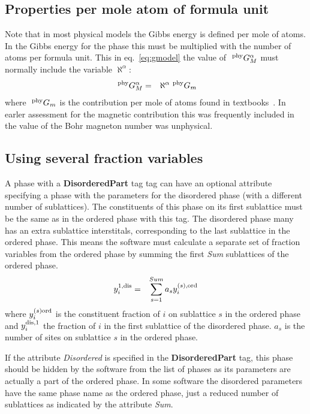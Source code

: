 \documentclass{article}
\begin{document}
\subsection{Properties per mole atom of formula unit}\label{sec:physmod}

Note that in most physical models the Gibbs energy is defined per mole
of atoms.  In the Gibbs energy for the phase this must be multiplied
with the number of atoms per formula unit.  This in
eq.~\ref{eq:gmodel} the value of $~^{\rm phy}G^{\alpha}_M$ must
normally include the variable $\aleph^{\alpha}$:
\begin{eqnarray}
~^{\rm phy}G^{\alpha}_M &=& \aleph^{\alpha} ~^{\rm phy}G_m \label{eq:perfm}
\end{eqnarray}
where $~^{\rm phy}G_m$ is the contribution per mole of atoms found in
textbooks~\cite{00Ans}.  In earler assessment for the magnetic
contribution this was frequently included in the value of the Bohr
magneton number was unphysical.



\subsection{Using several fraction variables}\label{sec:nodis}

A phase with a {\bf DisorderedPart} tag tag can have an optional
attribute specifying a phase with the parameters for the disordered
phase (with a different number of sublattices). The constituents of
this phase on its first sublattice must be the same as in the ordered
phase with this tag.  The disordered phase many has an extra
sublattice interstitals, corresponding to the last sublattice in the
ordered phase.  This means the software must calculate a separate set
of fraction variables from the ordered phase by summing the first {\em
  Sum} sublattices of the ordered phase.
\begin{eqnarray}
y^{1,\rm dis}_i &=& \sum^{Sum}_{s=1} a_s y^{(s),\rm ord}_i
\end{eqnarray}
where $y^{(s)\rm ord}_i$ is the constituent fraction of $i$ on
sublattice $s$ in the ordered phase and $y^{\rm dis,1}_i$ the fraction
of $i$ in the first sublattice of the disordered phase.  $a_s$ is the
number of sites on sublattice $s$ in the ordered phase.

If the attribute {\em Disordered} is specified in the {\bf
  DisorderedPart} tag, this phase should be hidden by the software
from the list of phases as its parameters are actually a part of the
ordered phase.  In some software the disordered parameters have the
same phase name as the ordered phase, just a reduced number of
sublattices as indicated by the attribute {\em Sum}.
\end{document}
